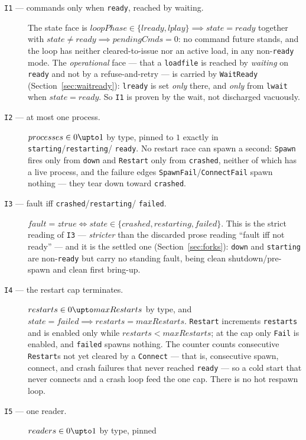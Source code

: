 \documentclass[a4paper,10pt,fleqn]{article}
\begin{document}
\begin{description}
  \item[\texttt{I1} --- commands only when \texttt{ready}, reached by waiting.]
    The state face is $loopPhase \in \{ lready, lplay \} \implies state =
    ready$ together with $state \neq ready \implies pendingCmds = 0$: no
    command future stands, and the loop has neither cleared-to-issue nor an
    active load, in any non-\texttt{ready} mode. The \emph{operational} face
    --- that a \texttt{loadfile} is reached by \emph{waiting} on \texttt{ready}
    and not by a refuse-and-retry --- is carried by \texttt{WaitReady}
    (Section~\ref{sec:waitready}): \texttt{lready} is set \emph{only} there, and
    \emph{only} from \texttt{lwait} when $state = ready$. So \texttt{I1} is
    proven by the wait, not discharged vacuously.
  \item[\texttt{I2} --- at most one process.] $processes \in 0 \upto 1$ by
    type, pinned to $1$ exactly in \texttt{starting}/\texttt{restarting}/%
    \texttt{ready}. No restart race can spawn a second: \texttt{Spawn} fires
    only from \texttt{down} and \texttt{Restart} only from \texttt{crashed},
    neither of which has a live process, and the failure edges
    \texttt{SpawnFail}/\texttt{ConnectFail} spawn nothing --- they tear down
    toward \texttt{crashed}.
  \item[\texttt{I3} --- fault iff \texttt{crashed}/\texttt{restarting}/%
    \texttt{failed}.] $fault = ztrue \iff state \in \{ crashed, restarting,
    failed \}$. This is the strict reading of \texttt{I3} --- \emph{stricter}
    than the discarded prose reading ``fault iff not ready'' --- and it is the
    settled one (Section~\ref{sec:forks}): \texttt{down} and \texttt{starting}
    are non-\texttt{ready} but carry no standing fault, being clean
    shutdown/pre-spawn and clean first bring-up.
  \item[\texttt{I4} --- the restart cap terminates.] $restarts \in 0 \upto
    maxRestarts$ by type, and $state = failed \implies restarts =
    maxRestarts$. \texttt{Restart} increments \texttt{restarts} and is enabled
    only while $restarts < maxRestarts$; at the cap only \texttt{Fail} is
    enabled, and \texttt{failed} spawns nothing. The counter counts consecutive
    \texttt{Restart}s not yet cleared by a \texttt{Connect} --- that is,
    consecutive spawn, connect, and crash failures that never reached
    \texttt{ready} --- so a cold start that never connects and a crash loop feed
    the one cap. There is no hot respawn loop.
  \item[\texttt{I5} --- one reader.] $readers \in 0 \upto 1$ by type, pinned

\end{description}
\end{document}

